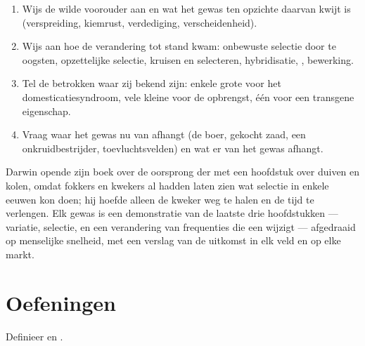 \begin{method}\label{met:g12:domesticated-plants:read}
\begin{enumerate}
  \item Wijs de wilde voorouder aan en wat het gewas ten opzichte daarvan
        kwijt is (verspreiding, kiemrust, verdediging, verscheidenheid).
  \item Wijs aan hoe de verandering tot stand kwam: onbewuste selectie
        door te oogsten, opzettelijke selectie, kruisen en selecteren,
        hybridisatie, , bewerking.
  \item Tel de betrokken  waar zij bekend zijn: enkele grote 
        voor het domesticatiesyndroom, vele kleine voor de opbrengst, één
        voor een transgene eigenschap.
  \item Vraag waar het gewas nu van afhangt (de boer, gekocht zaad, een
        onkruidbestrijder, toevluchtsvelden) en wat er van het gewas
        afhangt.
\end{enumerate}
\end{method}

\begin{remark}\label{rem:g12:domesticated-plants:oldest}
Darwin opende zijn boek over de oorsprong der  met een hoofdstuk
over duiven en kolen, omdat fokkers en kwekers al hadden laten zien wat
selectie in enkele eeuwen kon doen; hij hoefde alleen de kweker weg te
halen en de tijd te verlengen. Elk gewas is een demonstratie van de
laatste drie hoofdstukken --- variatie, selectie, en een verandering van
frequenties die een  wijzigt --- afgedraaid op menselijke snelheid,
met een verslag van de uitkomst in elk veld en op elke markt.
\end{remark}

\section{Oefeningen}

\begin{exercise}[$\star$]\label{exo:g12:domesticated-plants:1}
Definieer  en .
\end{exercise}

